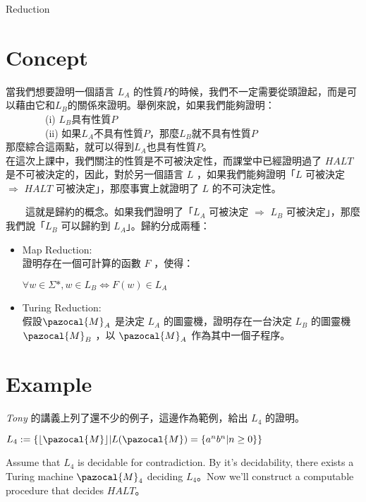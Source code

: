 \documentclass{article}
\DeclarePairedDelimiter\floor{\lfloor}{\rfloor}
\begin{document}
\begin{center}
    {\huge Reduction}
\end{center}

\section{Concept}
當我們想要證明一個語言 \(L_A\) 的性質\(P\)的時候，我們不一定需要從頭證起，而是可以藉由它和\(L_B\)的關係來證明。舉例來說，如果我們能夠證明：\\
　　　　(i) \(L_B\)具有性質\(P\)\\
　　　　(ii) 如果\(L_A\)不具有性質\(P\)，那麼\(L_B\)就不具有性質\(P\)\\

那麼綜合這兩點，就可以得到\(L_A\)也具有性質\(P\)。\\

在這次上課中，我們關注的性質是不可被決定性，而課堂中已經證明過了 \(HALT\) 是不可被決定的，因此，對於另一個語言 \(L\) ，如果我們能夠證明「\(L\) 可被決定 \(\Rightarrow\) \(HALT\) 可被決定」，那麼事實上就證明了 \(L\) 的不可決定性。

　　這就是歸約的概念。如果我們證明了「\(L_A\) 可被決定 \(\Rightarrow\) \(L_B\) 可被決定」，那麼我們說「\(L_B\) 可以歸約到 \(L_A\)」。歸約分成兩種：
    \begin{itemize}
    \item Map Reduction: \\
        證明存在一個可計算的函數 \(F\) ，使得：
        \begin{center} \(\forall w \in \Sigma*, w\in L_B \Leftrightarrow F(w) \in L_A\) \end{center}

    \item Turing Reduction:\\
        假設\(\pazocal{M}_A\) 是決定 \(L_A\) 的圖靈機，證明存在一台決定 \(L_B\) 的圖靈機 \(\pazocal{M}_B\) ，以 \(\pazocal{M}_A\) 作為其中一個子程序。
    \end{itemize}

\section{Example}
\textit{Tony} 的講義上列了還不少的例子，這邊作為範例，給出 \(L_4\) 的證明。

\(L_4:=\{\floor{\pazocal{M}} | L(\pazocal{M}) = \{a^nb^n | n\geq 0\}\}\)

Assume that \(L_4\) is decidable for contradiction. By it's decidability, there exists a Turing machine \(\pazocal{M}_4\) deciding \(L_4\)。Now we'll construct a computable procedure that decides \(HALT\)。
\end{document}
